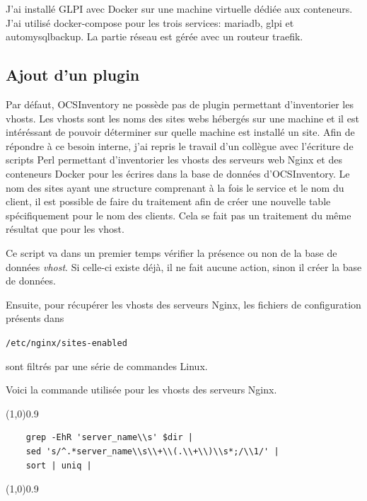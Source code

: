 \documentclass[12pt, a4paper, twoside]{article}
\begin{document}
J'ai installé \gls{GLPI} avec Docker sur une machine virtuelle dédiée aux conteneurs.
J'ai utilisé docker-compose pour les trois services: mariadb, glpi et automysqlbackup.
La partie réseau est gérée avec un routeur traefik.

\subsection{Ajout d'un plugin}
Par défaut, \gls{OCSInventory} ne possède pas de plugin permettant d'inventorier les vhosts. 
Les vhosts sont les noms des sites webs hébergés sur une machine et il est intéréssant de pouvoir déterminer sur quelle machine est installé un site. 
Afin de répondre à ce besoin interne, j'ai repris le travail d'un collègue avec l'écriture de scripts Perl permettant d'inventorier les vhosts des serveurs web Nginx et des conteneurs Docker pour les écrires dans la base de données d'\gls{OCSInventory}.
Le nom des sites ayant une structure comprenant à la fois le service et le nom du client, il est possible de faire du traitement afin de créer une nouvelle table spécifiquement pour le nom des clients.
Cela se fait pas un traitement du même résultat que pour les vhost.

Ce script va dans un premier temps vérifier la présence ou non de la base de données \textit{vhost}.
Si celle-ci existe déjà, il ne fait aucune action, sinon il créer la base de données.

Ensuite, pour récupérer les vhosts des serveurs Nginx, les fichiers de configuration présents dans \begin{code} \texttt{/etc/nginx/sites-enabled}\end{code} sont filtrés par une série de commandes \gls{Linux}.

Voici la commande utilisée pour les vhosts des serveurs Nginx.
\vspace{-1ex}
\begin{code}
\vspace{-1ex}
\begin{center} 
    \line(1,0){0.9\textwidth} 
\end{center}
\vspace{-1ex}
\begin{verbatim}
    grep -EhR 'server_name\\s' $dir | 
    sed 's/^.*server_name\\s\\+\\(.\\+\\)\\s*;/\\1/' |
    sort | uniq |
\end{verbatim}
    \vspace{-1ex}
\begin{center} 
    \line(1,0){0.9\textwidth} 
\end{center}
\end{code}
\end{document}
